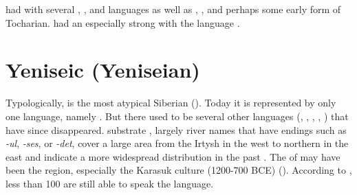  had  with several , , and  languages as well as , , and perhaps some early form of Tocharian.  had an especially strong  with the  language .

\section{Yeniseic (Yeniseian)}\label{sec:2.13}

Typologically,  is the most atypical Siberian  (). Today it is represented by only one language, namely . But there used to be several other  languages (, , , , ) that have since disappeared.  substrate , largely river names that have endings such as \textit{{}-ul}, \textit{{}-ses}, or \textit{{}-det}, cover a large area from the Irtysh in the west to northern  in the east and indicate a more widespread distribution in the past \citep[474]{Vajda2009b}. The  of  may have been the  region, especially the Karasuk culture (1200-700 BCE) (\citealt[1f.]{FlegontovChangmai2016}). According to \citet[33]{Vajda2010}, less than 100  are still able to speak the language.

